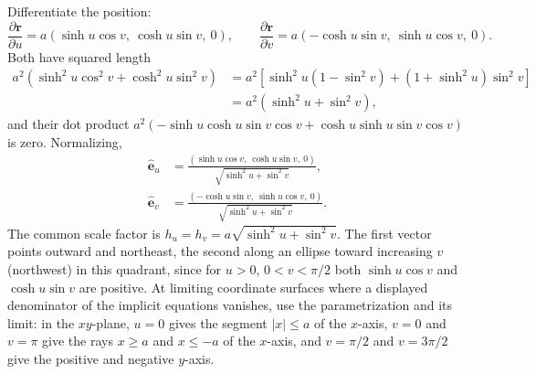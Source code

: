 Differentiate the position:
\[
\frac{\partial\mathbf r}{\partial u}
=a(\sinh u\cos v,\ \cosh u\sin v,\ 0),\qquad
\frac{\partial\mathbf r}{\partial v}
=a(-\cosh u\sin v,\ \sinh u\cos v,\ 0).
\]
Both have squared length
\[
\begin{aligned}
a^2(\sinh^2u\cos^2v+\cosh^2u\sin^2v)
&=a^2[\sinh^2u(1-\sin^2v)+(1+\sinh^2u)\sin^2v]\\
&=a^2(\sinh^2u+\sin^2v),
\end{aligned}
\]
and their dot product
$a^2(-\sinh u\cosh u\sin v\cos v+\cosh u\sinh u\sin v\cos v)$ is zero.
Normalizing,
\[
\boxed{\begin{aligned}
\hat{\mathbf e}_u&=
\frac{(\sinh u\cos v,\ \cosh u\sin v,\ 0)}
{\sqrt{\sinh^2u+\sin^2v}},\\
\hat{\mathbf e}_v&=
\frac{(-\cosh u\sin v,\ \sinh u\cos v,\ 0)}
{\sqrt{\sinh^2u+\sin^2v}}.
\end{aligned}}
\]
The common scale factor is $h_u=h_v=a\sqrt{\sinh^2u+\sin^2v}$.
The first vector points outward and northeast, the second along an
ellipse toward increasing $v$ (northwest) in this quadrant, since for
$u>0$, $0<v<\pi/2$ both $\sinh u\cos v$ and $\cosh u\sin v$ are
positive.
At limiting coordinate surfaces where a displayed denominator of the
implicit equations vanishes, use the parametrization and its limit:
in the $xy$-plane, $u=0$ gives the segment $|x|\le a$ of the $x$-axis,
$v=0$ and $v=\pi$ give the rays $x\ge a$ and $x\le-a$ of the $x$-axis,
and $v=\pi/2$ and $v=3\pi/2$ give the positive and negative $y$-axis.

